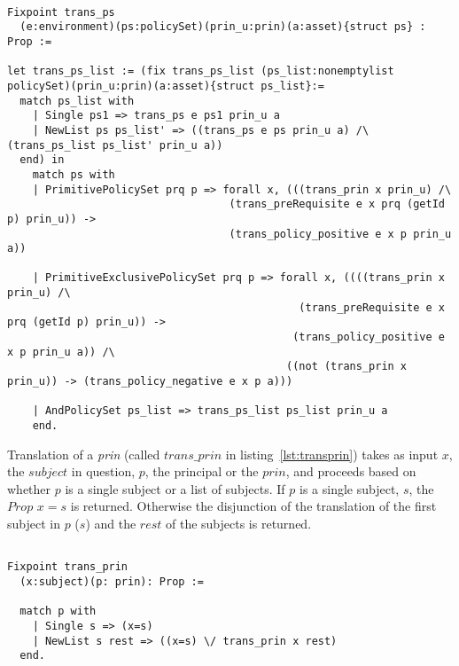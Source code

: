 \begin{minipage}{\linewidth}
\begin{lstlisting}

Fixpoint trans_ps
  (e:environment)(ps:policySet)(prin_u:prin)(a:asset){struct ps} : Prop :=

let trans_ps_list := (fix trans_ps_list (ps_list:nonemptylist policySet)(prin_u:prin)(a:asset){struct ps_list}:=
  match ps_list with
    | Single ps1 => trans_ps e ps1 prin_u a
    | NewList ps ps_list' => ((trans_ps e ps prin_u a) /\ (trans_ps_list ps_list' prin_u a))
  end) in
    match ps with
    | PrimitivePolicySet prq p => forall x, (((trans_prin x prin_u) /\ 
                                   (trans_preRequisite e x prq (getId p) prin_u)) -> 
                                   (trans_policy_positive e x p prin_u a))  

    | PrimitiveExclusivePolicySet prq p => forall x, ((((trans_prin x prin_u) /\ 
                                              (trans_preRequisite e x prq (getId p) prin_u)) -> 
                                             (trans_policy_positive e x p prin_u a)) /\
                                            ((not (trans_prin x prin_u)) -> (trans_policy_negative e x p a)))
                   
    | AndPolicySet ps_list => trans_ps_list ps_list prin_u a
    end.
\end{lstlisting}
\end{minipage}



Translation of a \emph{prin} (called $trans\_prin$ in listing~\ref{lst:transprin}) takes as input $x$, the $subject$ in question, $p$, the principal or the $prin$,  and proceeds based on whether $p$ is a single subject or a list of subjects. If $p$ is a single subject, $s$, the $Prop$ $x=s$ is returned. Otherwise the disjunction of the translation of the first subject in $p$ ($s$) and the $rest$ of the subjects is returned.

\begin{lstlisting}

Fixpoint trans_prin
  (x:subject)(p: prin): Prop :=

  match p with
    | Single s => (x=s)
    | NewList s rest => ((x=s) \/ trans_prin x rest)
  end.
\end{lstlisting}


